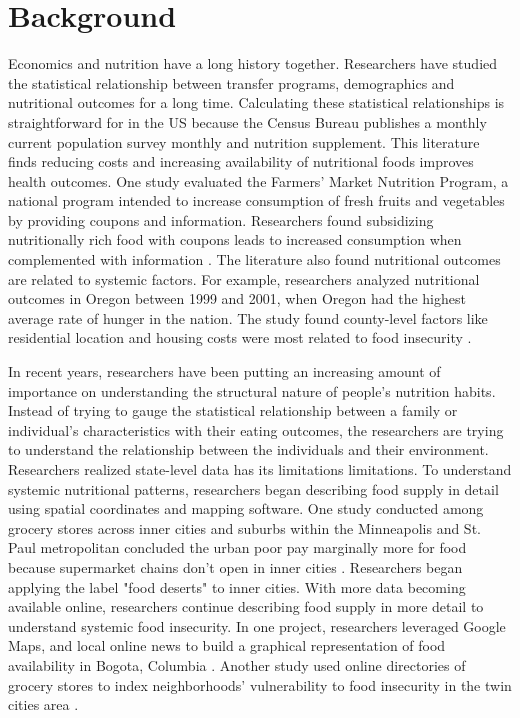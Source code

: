 \documentclass{report}
\begin{document}
\section{Background}
Economics and nutrition have a long history together. Researchers have studied the statistical relationship between transfer programs, demographics and nutritional outcomes for a long time. Calculating these statistical relationships is straightforward for in the US because the Census Bureau publishes a monthly current population survey monthly and nutrition supplement. This literature finds reducing costs and increasing availability of nutritional foods improves health outcomes. One study evaluated the Farmers' Market Nutrition Program, a national program intended to increase consumption of fresh fruits and vegetables by providing coupons and information. Researchers found subsidizing nutritionally rich food with coupons leads to increased consumption when complemented with information \cite{Just}. The literature also found nutritional outcomes are related to systemic factors. For example, researchers analyzed nutritional outcomes in Oregon between 1999 and 2001, when Oregon had the highest average rate of hunger in the nation. The study found county-level factors like residential location and housing costs were most related to food insecurity \cite{Bernell}. 
 

In recent years, researchers have been putting an increasing amount of importance on understanding the structural nature of people's nutrition habits. Instead of trying to gauge the statistical relationship between a family or individual's characteristics with their eating outcomes, the researchers are trying to understand the relationship between the individuals and their environment. Researchers realized state-level data has its limitations limitations. To understand systemic nutritional patterns, researchers began describing food supply in detail using spatial coordinates and mapping software.  One study conducted among grocery stores across inner cities and suburbs within the Minneapolis and St. Paul metropolitan concluded the urban poor pay marginally more for food because supermarket chains don't open in inner cities \cite{Chung}. Researchers began applying the label "food deserts" to inner cities. With more data becoming available online, researchers continue describing food supply in more detail to understand systemic food insecurity. In one project, researchers leveraged Google Maps, and local online news to build a graphical representation of food availability in Bogota, Columbia \cite{Hwang}. Another study used online directories of grocery stores to index neighborhoods' vulnerability to food insecurity in the twin cities area \cite{Larson}.
\end{document}
